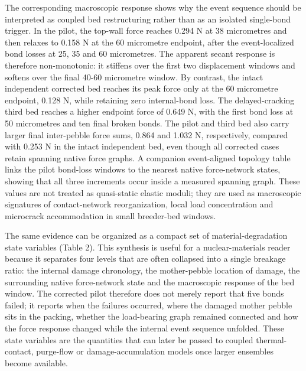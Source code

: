 \documentclass[5p,twocolumn]{elsarticle}
\begin{document}
The corresponding macroscopic response shows why the event sequence should be interpreted as coupled bed restructuring rather than as an isolated single-bond trigger. In the pilot, the top-wall force reaches 0.294 N at 38 micrometres and then relaxes to 0.158 N at the 60 micrometre endpoint, after the event-localized bond losses at 25, 35 and 60 micrometres. The apparent secant response is therefore non-monotonic: it stiffens over the first two displacement windows and softens over the final 40-60 micrometre window. By contrast, the intact independent corrected bed reaches its peak force only at the 60 micrometre endpoint, 0.128 N, while retaining zero internal-bond loss. The delayed-cracking third bed reaches a higher endpoint force of 0.649 N, with the first bond loss at 50 micrometres and ten final broken bonds. The pilot and third bed also carry larger final inter-pebble force sums, 0.864 and 1.032 N, respectively, compared with 0.253 N in the intact independent bed, even though all corrected cases retain spanning native force graphs. A companion event-aligned topology table links the pilot bond-loss windows to the nearest native force-network states, showing that all three increments occur inside a measured spanning graph. These values are not treated as quasi-static elastic moduli; they are used as macroscopic signatures of contact-network reorganization, local load concentration and microcrack accommodation in small breeder-bed windows.


The same evidence can be organized as a compact set of material-degradation state variables (Table 2). This synthesis is useful for a nuclear-materials reader because it separates four levels that are often collapsed into a single breakage ratio: the internal damage chronology, the mother-pebble location of damage, the surrounding native force-network state and the macroscopic response of the bed window. The corrected pilot therefore does not merely report that five bonds failed; it reports when the failures occurred, where the damaged mother pebble sits in the packing, whether the load-bearing graph remained connected and how the force response changed while the internal event sequence unfolded. These state variables are the quantities that can later be passed to coupled thermal-contact, purge-flow or damage-accumulation models once larger ensembles become available.
\end{document}
